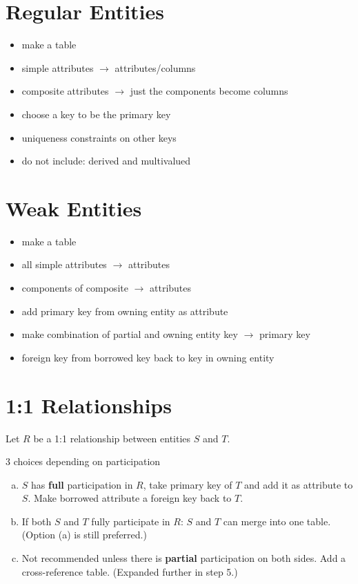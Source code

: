 \documentclass{../cheatsheet}
\newcommand{\ra}{$\rightarrow$\xspace}
\begin{document}
\begin{multicols*}{2}
    \section{Regular Entities}
    \begin{itemize}
        \item make a table
        \item simple attributes \ra{} attributes/columns
        \item composite attributes \ra{} just the components become columns
        \item choose a key to be the primary key
        \item uniqueness constraints on other keys
        \item do not include: derived and multivalued
    \end{itemize}

    \section{Weak Entities}
    \begin{itemize}
        \item make a table
        \item all simple attributes \ra{} attributes
        \item components of composite \ra{} attributes
        \item add primary key from owning entity as attribute
        \item make combination of partial and owning entity key \ra{} primary key
        \item foreign key from borrowed key back to key in owning entity
    \end{itemize}

    \section{1:1 Relationships}
    Let $R$ be a 1:1 relationship between entities $S$ and $T$.

    3 choices depending on participation
    \begin{enumerate}[(a)]
        \item $S$ has \textbf{full} participation in $R$, take primary key of $T$
            and add it as attribute to $S$. Make borrowed attribute a foreign key
            back to $T$.
        \item If both $S$ and $T$ fully participate in $R$: $S$ and $T$ can merge
            into one table. (Option (a) is still preferred.)
        \item Not recommended unless there is \textbf{partial} participation on both
            sides. Add a cross-reference table. (Expanded further in step 5.)
    \end{enumerate}


\end{multicols*}
\end{document}
